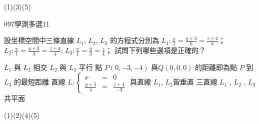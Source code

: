 \begin{QUESTIONS}
\begin{QUESTION}
\begin{QBODY}
        \end{QBODY}
        \begin{QFROMS}
        \end{QFROMS}
        \begin{QTAGS}\end{QTAGS}
        \begin{QANS}
            (1)(3)(5)
        \end{QANS}
        \begin{QSOLLIST}
        \end{QSOLLIST}
        \begin{QEMPTYSPACE}
        \end{QEMPTYSPACE}
    \end{QUESTION}
    \begin{QUESTION}
        \begin{ExamInfo}{097}{學測}{多選}{11}
        \end{ExamInfo}
        \begin{ExamAnsRateInfo}{27}{51}{19}{11}
        \end{ExamAnsRateInfo}
        \begin{QBODY}
			設坐標空間中三條直線 $L_1$, $L_2$, $L_3$ 的方程式分別為 $L_1: \frac{x}{1} = \frac{y+3}{6} = \frac{z+4}{8}$；$L_2: \frac{x}{1} = \frac{y+3}{3} = \frac{z+4}{4}$; $L_3: \frac{x}{1} = \frac{y}{3} = \frac{z}{4}$；
			試問下列哪些選項是正確的？
			\begin{QOPS} 
				\QOP $L_1$ 與 $L_2$ 相交 
				\QOP $L_2$ 與 $L_3$ 平行 
				\QOP 點 $P(0,-3,-4)$ 與$Q(0,0,0)$ 的距離即為點 $P$ 到 $L_3$ 的最短距離 
				\QOP 直線 $L: \left\{ \begin{array}{rcl} x & = & 0 \\ \frac{y+3}{4} &=& \frac{z+4}{-3} \end{array} \right.$ 與直線 $L_{1}$, $L_{2}$皆垂直
				\QOP 三直線 $L_1$ , $L_2$ , $L_3$ 共平面 
			\end{QOPS}
        \end{QBODY}
        \begin{QFROMS}
        \end{QFROMS}
        \begin{QTAGS}\end{QTAGS}
        \begin{QANS}
            (1)(2)(4)(5)
        \end{QANS}
        \begin{QSOLLIST}
        \end{QSOLLIST}
        \begin{QEMPTYSPACE}

\end{QEMPTYSPACE}
\end{QUESTION}
\end{QUESTIONS}
